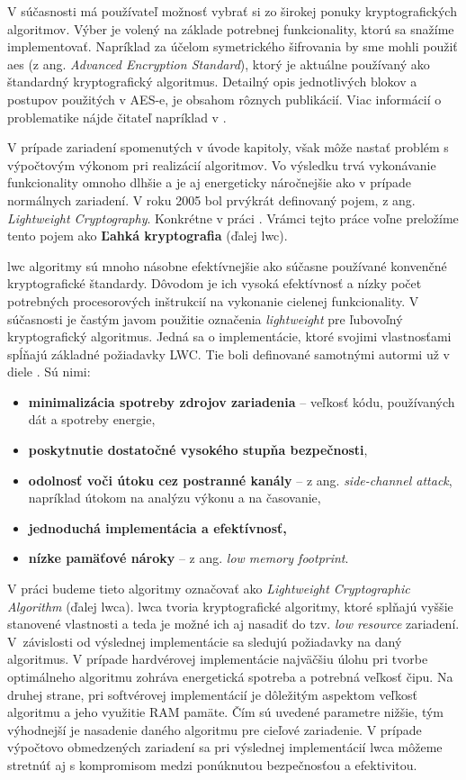 V súčasnosti má používateľ možnosť vybrať si zo širokej ponuky kryptografických algoritmov. Výber je volený na základe potrebnej funkcionality, ktorú sa snažíme implementovať. Napríklad za účelom symetrického šifrovania by sme mohli použiť \acrshort{aes} \cite{aes} (z ang. \textit{Advanced Encryption Standard}), ktorý je aktuálne používaný ako štandardný kryptografický algoritmus. Detailný opis jednotlivých blokov a postupov použitých v AES-e, je obsahom rôznych publikácií. Viac informácií o problematike nájde čitateľ napríklad v \cite{levicky}.

V prípade zariadení spomenutých v úvode kapitoly, však môže nastať problém s výpočtovým výkonom pri realizácií algoritmov. Vo výsledku trvá vykonávanie funkcionality omnoho dlhšie a je aj energeticky náročnejšie ako v prípade normálnych zariadení. V roku 2005 bol prvýkrát definovaný pojem, z ang. \textit{Lightweight Cryptography}. Konkrétne v práci \cite{lwc}. Vrámci tejto práce voľne preložíme tento pojem ako \textbf{Ľahká kryptografia} (ďalej \acrshort{lwc}). 

\acrshort{lwc} algoritmy sú mnoho násobne efektívnejšie ako súčasne používané konvenčné kryptografické štandardy. Dôvodom je ich vysoká efektívnosť a nízky počet potrebných procesorových inštrukcií na vykonanie cielenej funkcionality. V súčasnosti je častým javom použitie označenia \textit{lightweight} pre ľubovoľný kryptografický algoritmus. Jedná sa o implementácie, ktoré svojimi vlastnosťami spĺňajú základné požiadavky LWC. Tie boli definované samotnými autormi už v diele \cite{lwc}. Sú nimi: 
\begin{itemize}
	\item{\textbf{minimalizácia spotreby zdrojov zariadenia}} -- veľkosť kódu, používaných dát a spotreby energie,
	\item{\textbf{poskytnutie dostatočné vysokého stupňa bezpečnosti}},
	\item{\textbf{odolnosť voči útoku cez postranné kanály} -- z ang. \textit{side-channel attack}}, napríklad útokom na analýzu výkonu a na časovanie, 
	\item{\textbf{jednoduchá implementácia a efektívnosť,}}
	\item{\textbf{nízke pamäťové nároky}} -- z ang. \textit{low memory footprint}.
\end{itemize}

V práci budeme tieto algoritmy označovať ako \textit{Lightweight Cryptographic Algorithm} (ďalej \acrshort{lwca}).
\acrshort{lwca} tvoria kryptografické algoritmy, ktoré splňajú vyššie stanovené vlastnosti a teda je možné ich aj nasadiť do tzv. \textit{low resource} zariadení. V~závislosti od výslednej implementácie sa sledujú požiadavky na daný algoritmus. V prípade hardvérovej implementácie najväčšiu úlohu pri tvorbe optimálneho algoritmu zohráva energetická spotreba a potrebná veľkosť čipu. Na druhej strane, pri softvérovej implementácií je dôležitým aspektom veľkosť algoritmu a jeho využitie RAM pamäte. Čím sú uvedené parametre nižšie, tým výhodnejší je nasadenie daného algoritmu pre cieľové zariadenie. V prípade výpočtovo obmedzených zariadení sa pri výslednej implementácií \acrshort{lwca} môžeme stretnúť aj s kompromisom medzi ponúknutou bezpečnosťou a efektivitou.

